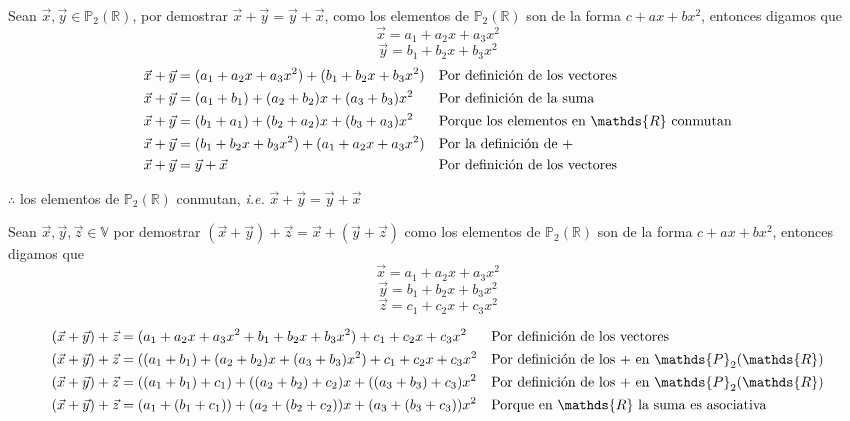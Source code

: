 \documentclass[letterpaper]{article}
\newcommand{\V}{\mathds{V}}
\newcommand{\R}{\mathds{R}}
\newcommand{\Po}{\mathds{P}_2(\mathds{R})}
\renewcommand{\*}{\cdot}
\theoremstyle{definition}
\begin{document}
Sean $ \vec{x}, \vec{y} \in \Po $, por demostrar $\vec{x} + \vec{y} = \vec{y} + \vec{x}  $, como los elementos de $ \Po $ son de la forma $ c + ax + bx^2$, entonces digamos que \[ \vec{x} = a_1 + a_2x + a_3x^2 \] \[ \vec{y} = b_1 + b_2x + b_3x^2 \]
\begin{align*}
	\vec{x} + \vec{y} &=  (a_1 + a_2x + a_3x^2) + (b_1 + b_2x + b_3x^2) && \text{Por definición de los vectores}\\
	\vec{x} + \vec{y} &=  (a_1 + b_1) + (a_2 + b_2)x + (a_3 + b_3)x^2&& \text{Por definición de la suma}\\
	\vec{x} + \vec{y} &=  (b_1 + a_1) + (b_2 + a_2)x + (b_3 + a_3)x^2&& \text{Porque los elementos en $ \R $ conmutan}\\
	\vec{x} + \vec{y} &=  (b_1 + b_2x + b_3x^2) + (a_1 + a_2x + a_3x^2) && \text{Por la definición de +}\\
	\vec{x} + \vec{y} &=  \vec{y} + \vec{x}&& \text{Por definición de los vectores}\\
\end{align*}
\begin{center}
	$ \therefore $ los elementos de $ \Po $ conmutan, \textit{i.e.} $ \vec{x} + \vec{y} = 	\vec{y} + \vec{x} $
\end{center}

Sean $ \vec{x}, \vec{y}, \vec{z} \in \V $ por demostrar $  (\vec{x} + \vec{y}) + \vec{z} = \vec{x} + (\vec{y} + \vec{z})$
como los elementos de $ \Po $ son de la forma $ c + ax + bx^2$, entonces digamos que \[ \vec{x} = a_1 + a_2x + a_3x^2 \] \[ \vec{y} = b_1 + b_2x + b_3x^2 \] \[ \vec{z} = c_1 + c_2x + c_3x^2 \]

\begin{align*}
	(\vec{x} + \vec{y}) + \vec{z} &= ( a_1 + a_2x + a_3x^2 + b_1 + b_2x + b_3x^2) + c_1 + c_2x + c_3x^2&& \text{Por definición de los vectores}\\
	(\vec{x} + \vec{y}) + \vec{z} &= ( (a_1 + b_1)  + (a_2 + b_2)x + (a_3 + b_3) x^2 ) + c_1 + c_2x + c_3x^2&& \text{Por definición de los + en $ \Po $}\\ 
	(\vec{x} + \vec{y}) + \vec{z} &= ((a_1 + b_1) + c_1)  + ((a_2 + b_2) + c_2 )x + ((a_3 + b_3) + c_3) x^2 && \text{Por definición de los + en $ \Po $}\\ 
	(\vec{x} + \vec{y}) + \vec{z} &= (a_1 + (b_1 + c_1))  + (a_2 + (b_2 + c_2))x + (a_3 + (b_3 + c_3)) x^2 && \text{Porque en $ \R $ la suma es asociativa}\\ 
\end{align*}
\end{document}
